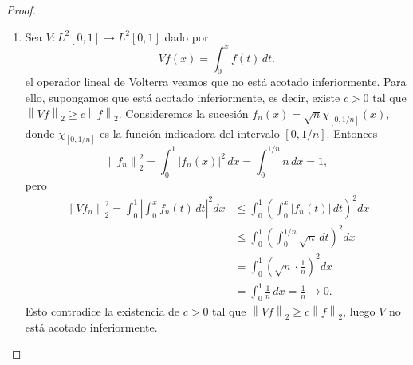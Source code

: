 \documentclass{article}
\theoremstyle{definition}
\newcommand{\norm}[1]{\left\lVert #1 \right\rVert}       %
\begin{document}
\begin{proof}
\begin{enumerate}
\[                  \norm{T^{-1}y} \le \norm{T^{-1}} \norm{y} \implies \norm{T^{-1}y} \cdot \frac{1}{\norm{T^{-1}}} \le \norm{Tx} \implies \norm{x} \cdot \frac{1}{\norm{T^{-1}}} \le \norm{Tx}
              \]
              Luego, \( T \) está acotada inferiormente.
        \item Sea \( V : L^2[0,1] \to L^2[0,1] \) dado por
              \[
                  Vf(x) = \int_0^x f(t)\,dt.
              \]
              el operador lineal de Volterra veamos que no está acotado inferiormente. Para ello, supongamos que está acotado inferiormente, es decir, existe \( c > 0 \) tal que \( \norm{Vf}_2 \ge c \norm{f}_2 \). Consideremos la sucesión \( f_n(x) = \sqrt{n} \chi_{[0,1/n]}(x) \), donde \( \chi_{[0,1/n]} \) es la función indicadora del intervalo \( [0,1/n] \). Entonces
              \[
                  \norm{f_n}_2^2 = \int_0^1 |f_n(x)|^2 \, dx = \int_0^{1/n} n \, dx = 1,
              \]
              pero
              \begin{align*}
                  \norm{Vf_n}_2^2 = \int_0^1 \left| \int_0^x f_n(t) \, dt \right|^2 dx & \le \int_0^1 {\left( \int_0^x |f_n(t)| \, dt \right)}^2 dx     \\
                                                                                       & \le \int_0^1 {\left( \int_0^{1/n} \sqrt{n} \, dt \right)}^2 dx \\
                                                                                       & = \int_0^1 {\left( \sqrt{n} \cdot \frac{1}{n} \right)}^2 dx    \\
                                                                                       & = \int_0^1 \frac{1}{n} \, dx = \frac{1}{n} \to 0.
              \end{align*}
              Esto contradice la existencia de \( c > 0 \) tal que \( \norm{Vf}_2 \ge c \norm{f}_2 \), luego \( V \) no está acotado inferiormente.
    \end{enumerate}
\end{proof}

\clearpage
\end{document}
